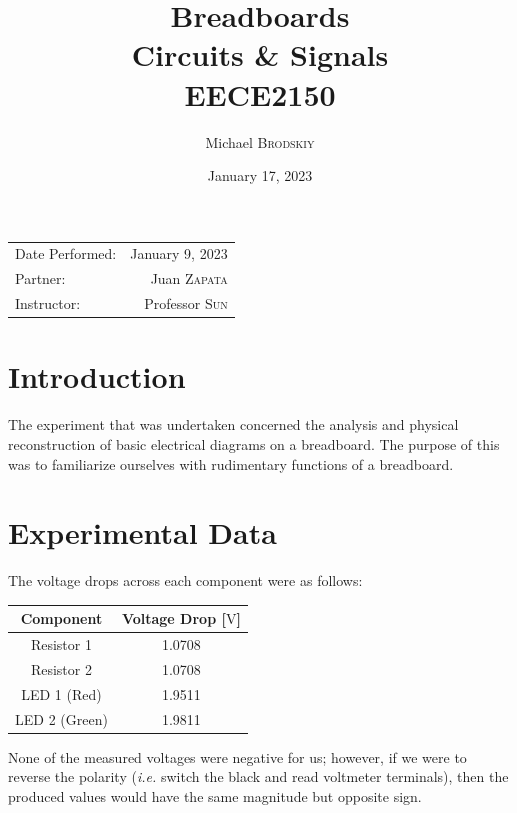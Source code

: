 \documentclass[
	letterpaper, %
	10pt, %
]{CSUniSchoolLabReport}
\title{Breadboards \\ Circuits \& Signals \\ EECE2150} %
\author{Michael \textsc{Brodskiy}}
\date{January 17, 2023} %
\begin{document}
\maketitle %

\begin{center}
	\begin{tabular}{l r}
		Date Performed: & January 9, 2023 \\ %
        Partner: & Juan \textsc{Zapata} \\ %
		Instructor: & Professor \textsc{Sun} %
	\end{tabular}
\end{center}

\section{Introduction}

The experiment that was undertaken concerned the analysis and physical reconstruction of basic electrical diagrams on a breadboard. The purpose of this was to familiarize ourselves with rudimentary functions of a breadboard.

\section{Experimental Data}

The voltage drops across each component were as follows:

\begin{center}
\begin{tabular}[h]{|c|c|}
  \hline
  Component & Voltage Drop [$\si{\volt}$]\\
  \hline
  Resistor 1 & 1.0708\\
  \hline
  Resistor 2 & 1.0708\\
  \hline
  LED 1 (Red) & 1.9511\\
  \hline
  LED 2 (Green) & 1.9811\\
  \hline
\end{tabular}
\end{center}

None of the measured voltages were negative for us; however, if we were to reverse the polarity (\textit{i.e.} switch the black and read voltmeter terminals), then the produced values would have the same magnitude but opposite sign.\\
\end{document}
